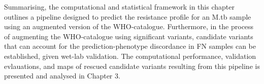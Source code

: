 Summarising, the computational and statistical framework in this chapter outlines a pipeline designed to predict the resistance profile for an M.tb sample using an augmented version of the WHO-catalogue. Furthermore, in the process of augmenting the WHO-catalogue using significant variants, candidate variants that can account for the prediction-phenotype discordance in FN samples can be established, given wet-lab validation. The computational performance, validation evlauations, and maps of rescued candidate variants resulting from this pipeline is presented and analysed in Chapter 3.

